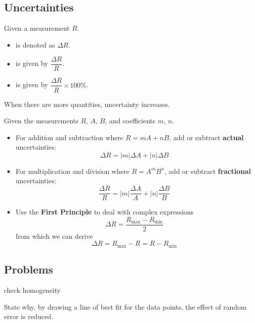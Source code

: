\subsection{Uncertainties}
Given a measurement $R$.
\begin{itemize}
\item {} is denoted as $\Delta R$.
\item {} is given by $\dfrac{\Delta R}{R}$.
\item {} is given by $\dfrac{\Delta R}{R} \times 100\%$.
\end{itemize}

When there are more quantities, uncertainty increases.

Given the measurements $R$, $A$, $B$, and coefficients $m$, $n$.
\begin{itemize}
\item For addition and subtraction where $R = mA + nB$, add or subtract \textbf{actual} uncertainties:
\begin{equation} \Delta R = |m| \Delta A + |n| \Delta B \end{equation}

\item For multiplication and division where $R = A^m B^n$, add or subtract \textbf{fractional} uncertainties:
\begin{equation} \frac{\Delta R}{R} = |m| \frac{\Delta A}{A} + |n| \frac{\Delta B}{B} \end{equation}

\item Use the \textbf{First Principle} to deal with complex expressions 
\begin{equation} \Delta R = \frac{R_{\mathrm{max}} - R_{\mathrm{min}}}{2} \end{equation}
from which we can derive 
\[ \Delta R = R_{\mathrm{max}} - R = R - R_{\mathrm{min}} \]
\end{itemize}
\pagebreak

\subsection{Problems}
\begin{prbm}
check homogeneity
\end{prbm}

\begin{prbm}
State why, by drawing a line of best fit for the data points, the effect of random error is reduced.
\end{prbm}

